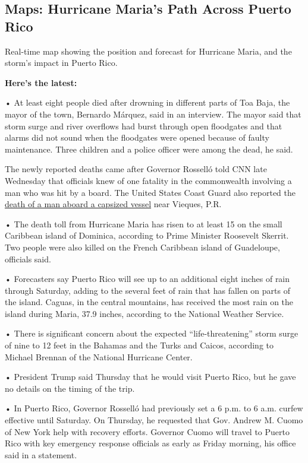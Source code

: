 \hypertarget{maps-hurricane-marias-path-across-puerto-rico}{%
\subsection{Maps: Hurricane Maria's Path Across Puerto
Rico}\label{maps-hurricane-marias-path-across-puerto-rico}}

Real-time map showing the position and forecast for Hurricane Maria, and
the storm's impact in Puerto Rico.

\textbf{Here's the latest:}

• At least eight people died after drowning in different parts of Toa
Baja, the mayor of the town, Bernardo Márquez, said in an interview. The
mayor said that storm surge and river overflows had burst through open
floodgates and that alarms did not sound when the floodgates were opened
because of faulty maintenance. Three children and a police officer were
among the dead, he said.

The newly reported deaths came after Governor Rosselló told CNN late
Wednesday that officials knew of one fatality in the commonwealth
involving a man who was hit by a board. The United States Coast Guard
also reported the
\href{https://content.govdelivery.com/accounts/USDHSCG/bulletins/1b8858e}{death
of a man aboard a capsized vessel} near Vieques, P.R.

• The death toll from Hurricane Maria has risen to at least 15 on the
small Caribbean island of Dominica, according to Prime Minister
Roosevelt Skerrit. Two people were also killed on the French Caribbean
island of Guadeloupe, officials said.

• Forecasters say Puerto Rico will see up to an additional eight inches
of rain through Saturday, adding to the several feet of rain that has
fallen on parts of the island. Caguas, in the central mountains, has
received the most rain on the island during Maria, 37.9 inches,
according to the National Weather Service.

• There is significant concern about the expected ``life-threatening''
storm surge of nine to 12 feet in the Bahamas and the Turks and Caicos,
according to Michael Brennan of the National Hurricane Center.

• President Trump said Thursday that he would visit Puerto Rico, but he
gave no details on the timing of the trip.

• In Puerto Rico, Governor Rosselló had previously set a 6 p.m. to 6
a.m. curfew effective until Saturday. On Thursday, he requested that
Gov. Andrew M. Cuomo of New York help with recovery efforts. Governor
Cuomo will travel to Puerto Rico with key emergency response officials
as early as Friday morning, his office said in a statement.

